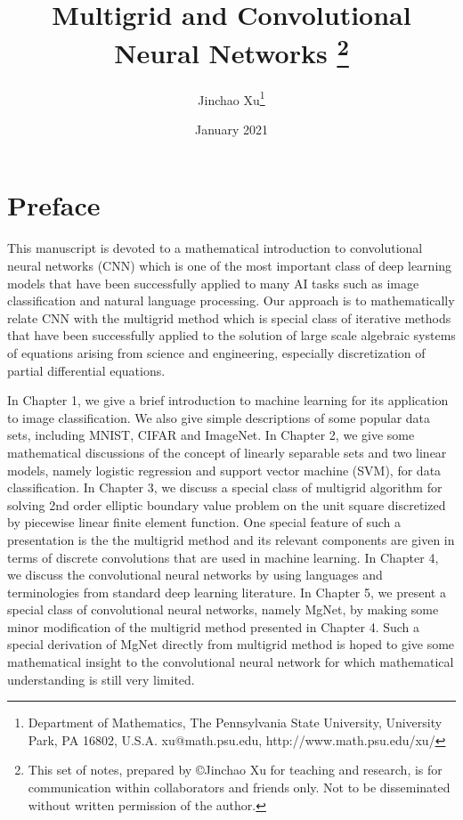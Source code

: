 \documentclass[leqno,labelfig,psfigt,colorlinks]{svmono}
\begin{document}
\title{Multigrid and Convolutional Neural Networks
%
\thanks{This set of notes,  prepared by \copyright Jinchao Xu for teaching and research, is for 
 communication within collaborators and friends
only.  Not to be disseminated without written permission
of the author.}
}
\author{Jinchao Xu\footnote{
Department of Mathematics,
The Pennsylvania State University, University Park, PA 16802,
U.S.A. xu@math.psu.edu,  http://www.math.psu.edu/xu/}}
\date{January 2021}

\maketitle 

\tableofcontents

\setcounter{chapter}{-1}
\chapter{Preface}
This manuscript is devoted to a mathematical introduction to
convolutional neural networks (CNN) which is one of the most important class
of deep learning models that have been successfully applied to many AI
tasks such as image classification and natural language processing.
Our approach is to mathematically relate CNN with the multigrid
method which is special class of iterative methods that have been
successfully applied to the solution of large scale algebraic systems
of equations arising from science and engineering, especially
discretization of partial differential equations. 

In Chapter 1, we give a brief introduction to machine learning for its
application to image classification.  We also give simple descriptions
of some popular data sets, including MNIST, CIFAR and ImageNet.  In
Chapter 2, we give some mathematical discussions of the concept of
linearly separable sets and two linear models, namely logistic
regression and support vector machine (SVM), for data classification.
In Chapter 3, we discuss a special class of multigrid algorithm for
solving 2nd order elliptic boundary value problem on the unit square
discretized by piecewise linear finite element function.  One special
feature of such a presentation is the the multigrid method and its
relevant components are given in terms of discrete convolutions that
are used in machine learning.  In Chapter 4, we discuss the
convolutional neural networks by using languages and terminologies
from standard deep learning literature.  In Chapter 5, we present a
special class of convolutional neural networks, namely MgNet, by
making some minor modification of the multigrid method presented in
Chapter 4.  Such a special derivation of MgNet directly from multigrid
method is hoped to give some mathematical insight to the convolutional
neural network for which mathematical understanding is still very
limited.
\end{document}

